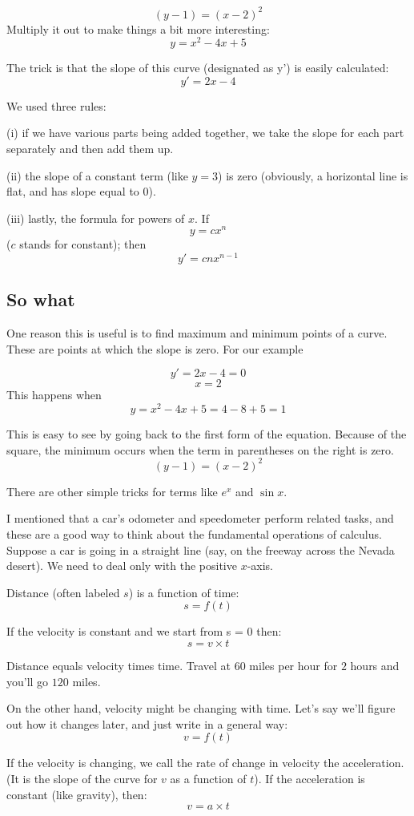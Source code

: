 \documentclass[11pt, oneside]{article}
\begin{document}
\[ (y-1) = (x-2)^2 \]
Multiply it out to make things a bit more interesting:
\[ y = x^2 - 4x + 5 \]

The trick is that the slope of this curve (designated as y') is easily calculated:
\[ y' = 2x - 4 \]

We used three rules: 

(i) if we have various parts being added together, we take the slope for each part separately and then add them up.

(ii) the slope of a constant term (like $y = 3$) is zero (obviously, a horizontal line is flat, and has slope equal to 0).

(iii) lastly, the formula for powers of $x$.  If
\[ y  = c x^n \]
($c$ stands for constant);  then
\[ y' = c n x^{n-1} \]

\subsection*{So what}
One reason this is useful is to find maximum and minimum points of a curve. These are points at which the slope is zero. For our example

\[ y' = 2x - 4 = 0 \]
\[ x = 2 \]
This happens when
\[ y = x^2 - 4x + 5 = 4 - 8 + 5 = 1 \]

This is easy to see by going back to the first form of the equation. Because of the square, the minimum occurs when the term in parentheses on the right is zero.
\[ (y-1) = (x-2)^2 \]

There are other simple tricks for terms like $e^x$ and $\sin x$.

I mentioned that a car's odometer and speedometer perform related tasks, and these are a good way to think about the fundamental operations of calculus. Suppose a car is going in a straight line (say, on the freeway across the Nevada desert). We need to deal only with the positive $x$-axis. 

Distance (often labeled $s$) is a function of time:
\[ s = f(t) \]

If the velocity is constant and we start from s = 0 then:
\[ s = v \times t \]

Distance equals velocity times time. Travel at $60$ miles per hour for $2$ hours and you'll go $120$ miles.

On the other hand, velocity might be changing with time. Let's say we'll figure out how it changes later, and just write in a general way:
\[ v = f(t) \]

If the velocity is changing, we call the rate of change in velocity the acceleration. (It is the slope of the curve for $v$ as a function of $t$). If the acceleration is constant (like gravity), then:
\[ v = a \times t \]
\end{document}
